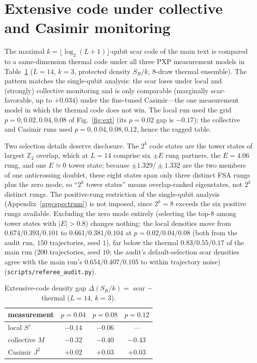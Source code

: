 \documentclass[aps,prb,twocolumn]{revtex4-2}
\newcommand{\Ztwo}{\mathbb{Z}_2}
\begin{document}
\section{Extensive code under collective and Casimir monitoring}
\label{app:extensive}

The maximal $k=\lfloor\log_2(L{+}1)\rfloor$-qubit scar code of the main text is
compared to a same-dimension thermal code under all three PXP measurement models
in Table~\ref{tab:ext} ($L=14$, $k=3$, protected density $S_R/k$, $8$-draw
thermal ensemble). The pattern matches the single-qubit analysis: the scar loses
under local and (strongly) collective monitoring and is only comparable
(marginally scar-favorable, up to $+0.034$) under the fine-tuned
Casimir---the one measurement model in which the thermal code does not win.
The local run used the grid $p=0,0.02,0.04,0.08$ of Fig.~\ref{fig:ext} (its
$p=0.02$ gap is $-0.17$); the collective and Casimir runs used
$p=0,0.04,0.08,0.12$, hence the ragged table.

Two selection details deserve disclosure. The $2^k$ code states are the
tower states of largest $\Ztwo$ overlap, which at $L=14$ comprise six
$\pm E$ rung partners, the $E=4.06$ rung, and one $E\simeq0$ tower state;
because $\pm1.329/\pm1.332$ are the two members of one anticrossing doublet,
these eight states span only three distinct FSA rungs plus the zero mode,
so ``$2^k$ tower states'' means overlap-ranked eigenstates, not $2^k$
distinct rungs. The positive-rung restriction of the single-qubit analysis
(Appendix~\ref{app:spectrum}) is not imposed, since $2^k=8$ exceeds the six
positive rungs available. Excluding the zero mode entirely (selecting the
top-$8$ among tower states with $|E|>0.8$) changes nothing: the local
densities move from $0.674/0.393/0.101$ to $0.661/0.381/0.104$ at
$p=0.02/0.04/0.08$ (both from the audit run, $150$ trajectories, seed $1$),
far below the thermal $0.83/0.55/0.17$ of the main run ($200$ trajectories,
seed $10$; the audit's default-selection scar densities agree with the main
run's $0.654/0.407/0.105$ to within trajectory noise)
(\texttt{scripts/referee\_audit.py}).

\begin{table}[h]
\caption{Extensive-code density gap $\Delta(S_R/k)=$ scar $-$ thermal ($L=14$,
$k=3$).}
\label{tab:ext}
\centering
\begin{tabular}{lccc}
\toprule
measurement & $p{=}0.04$ & $p{=}0.08$ & $p{=}0.12$ \\
\midrule
local $S^z$    & $-0.14$ & $-0.06$ & --- \\
collective $M$ & $-0.32$ & $-0.40$ & $-0.43$ \\
Casimir $J^2$  & $+0.02$ & $+0.03$ & $+0.03$ \\
\bottomrule
\end{tabular}
\end{table}



\end{document}
